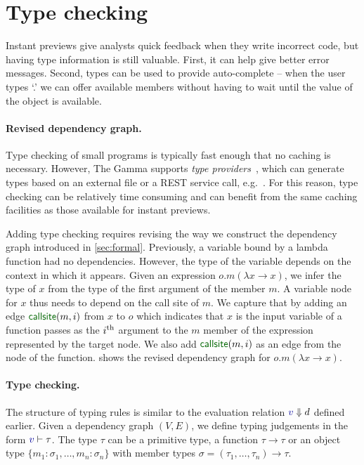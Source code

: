 \documentclass[english,crc,references=cleveref]{programming}
\theoremstyle{plain}
\theoremstyle{definition}
\newcommand{\bndclr}[1]{\textcolor{kvdclr}{#1}}
\newcommand{\blbl}[1]{\textnormal{\textcolor{numclr}{\sffamily #1}}}
\begin{document}

\section{Type checking}
\label{sec:extra-types}

Instant previews give analysts quick feedback when they write incorrect code, but
having type information is still valuable. First, it can help give better error messages. Second,
types can be used to provide auto-complete -- when the user types `.' we can offer available
members without having to wait until the value of the object is available.

\paragraph{Revised dependency graph.}
Type checking of small programs is typically fast enough that no caching is necessary. However,
The Gamma supports \emph{type providers}~\cite{providers-fsharp,providers-idris}, which can
generate types based on an external file or a REST service call, e.\hairspace g.~\cite{fsdata}. For this
reason, type checking can be relatively time consuming and can benefit from the same caching
facilities as those available for instant previews.

Adding type checking requires revising the way we construct the dependency graph introduced in
\cref{sec:formal}. Previously, a variable bound by a lambda function had no dependencies.
However, the type of the variable depends on the context in which it appears. Given an expression
$o.m(\lambda x\rightarrow x)$, we infer the type of $x$ from the type of the first argument
of the member $m$. A variable node for $x$ thus needs to depend on the call site of $m$.
We capture that by adding an edge $\blbl{callsite}(m, i)$ from $x$ to $o$ which indicates that
$x$ is the input variable of a function passes as the $i^\textnormal{th}$ argument to the $m$
member of the expression represented by the target node. We also add $\blbl{callsite}(m, i)$
as an edge from the node of the function.  shows the
revised dependency graph for $o.m(\lambda x\rightarrow x)$. %

\paragraph{Type checking.}
The structure of typing rules is similar to the evaluation relation $\bndclr{v}\Downarrow d$
defined earlier. Given a dependency graph $(V, E)$, we define typing judgements in the form
$\bndclr{v}\vdash \tau$. The type $\tau$ can be a primitive type, a function $\tau \rightarrow \tau$
or an object type $\{m_1\!:\!\sigma_1, \ldots, m_n\!:\!\sigma_n\}$ with member types
$\sigma = (\tau_1, \ldots, \tau_n) \rightarrow \tau$.
\end{document}

